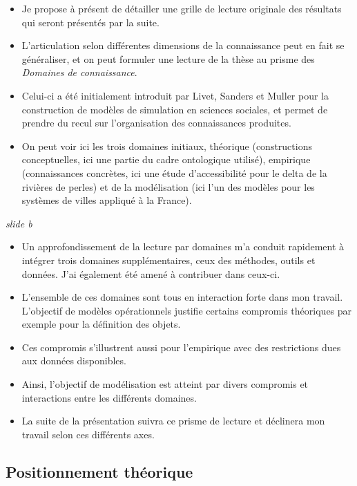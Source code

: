 \documentclass[12pt]{article}
\begin{document}
\begin{itemize}
	\item Je propose à présent de détailler une grille de lecture originale des résultats qui seront présentés par la suite.
	\item L'articulation selon différentes dimensions de la connaissance peut en fait se généraliser, et on peut formuler une lecture de la thèse au prisme des \emph{Domaines de connaissance}.
	\item Celui-ci a été initialement introduit par Livet, Sanders et Muller pour la construction de modèles de simulation en sciences sociales, et permet de prendre du recul sur l'organisation des connaissances produites.
	\item On peut voir ici les trois domaines initiaux, théorique (constructions conceptuelles, ici une partie du cadre ontologique utilisé), empirique (connaissances concrètes, ici une étude d'accessibilité pour le delta de la rivières de perles) et de la modélisation (ici l'un des modèles pour les systèmes de villes appliqué à la France).
\end{itemize}

\textit{slide b}

\begin{itemize}
\item Un approfondissement de la lecture par domaines m'a conduit rapidement à intégrer trois domaines supplémentaires, ceux des méthodes, outils et données. J'ai également été amené à contribuer dans ceux-ci.
	\item L'ensemble de ces domaines sont tous en interaction forte dans mon travail. L'objectif de modèles opérationnels justifie certains compromis théoriques par exemple pour la définition des objets.     
	\item Ces compromis s'illustrent aussi pour l'empirique avec des restrictions dues aux données disponibles.
	\item Ainsi, l'objectif de modélisation est atteint par divers compromis et interactions entre les différents domaines.
\item La suite de la présentation suivra ce prisme de lecture et déclinera mon travail selon ces différents axes.
\end{itemize}


\newpage


\subsection*{Positionnement théorique}
\end{document}
